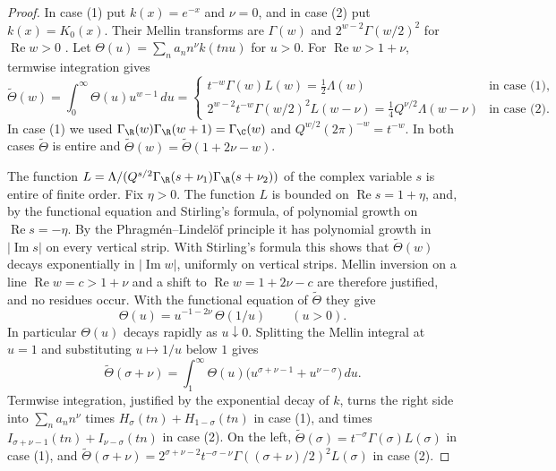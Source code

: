 \begin{proof}
In case (1) put $k(x)=e^{-x}$ and $\nu=0$, and in case (2) put
$k(x)=K_0(x)$. Their Mellin transforms are $\Gamma(w)$ and
$2^{w-2}\Gamma(w/2)^2$ for $\operatorname{Re}w>0$
\cite[10.43.19]{DLMF}. Let $\Theta(u)=\sum_na_nn^\nu k(tnu)$ for $u>0$. For
$\operatorname{Re}w>1+\nu$, termwise integration gives
\[
 \widetilde\Theta(w)=\int_0^\infty\Theta(u)u^{w-1}\,du=
 \begin{cases}
 t^{-w}\Gamma(w)L(w)=\tfrac12\Lambda(w)&\text{in case (1)},\\
 2^{w-2}t^{-w}\Gamma(w/2)^2L(w-\nu)=\tfrac14Q^{\nu/2}\Lambda(w-\nu)
 &\text{in case (2)}.
 \end{cases}
\]
In case (1) we used $\Gamma_\R(w)\Gamma_\R(w+1)=\Gamma_\C(w)$ and
$Q^{w/2}(2\pi)^{-w}=t^{-w}$. In both cases $\widetilde\Theta$ is entire and
$\widetilde\Theta(w)=\widetilde\Theta(1+2\nu-w)$.

The function $L=\Lambda/(Q^{s/2}\Gamma_\R(s+\nu_1)\Gamma_\R(s+\nu_2))$ of the
complex variable $s$ is entire of finite order. Fix $\eta>0$. The function
$L$ is bounded on $\operatorname{Re}s=1+\eta$, and, by the functional
equation and Stirling's formula, of polynomial growth on
$\operatorname{Re}s=-\eta$. By the Phragm\'en--Lindel\"of principle it has
polynomial growth in $|\operatorname{Im}s|$ on every vertical strip. With
Stirling's formula this shows that $\widetilde\Theta(w)$ decays exponentially in
$|\operatorname{Im}w|$, uniformly on vertical strips. Mellin inversion on a
line $\operatorname{Re}w=c>1+\nu$ and a shift to
$\operatorname{Re}w=1+2\nu-c$ are therefore justified, and no residues
occur. With the functional equation of $\widetilde\Theta$ they give
\[
 \Theta(u)=u^{-1-2\nu}\,\Theta(1/u)\qquad(u>0).
\]
In particular $\Theta(u)$ decays rapidly as $u\downarrow0$. Splitting the
Mellin integral at $u=1$ and substituting $u\mapsto1/u$ below $1$ gives
\[
 \widetilde\Theta(\sigma+\nu)=\int_1^\infty\Theta(u)
 \bigl(u^{\sigma+\nu-1}+u^{\nu-\sigma}\bigr)\,du.
\]
Termwise integration, justified by the exponential decay of $k$, turns the
right side into $\sum_na_nn^\nu$ times $H_\sigma(tn)+H_{1-\sigma}(tn)$ in case
(1), and times $I_{\sigma+\nu-1}(tn)+I_{\nu-\sigma}(tn)$ in case (2). On the
left, $\widetilde\Theta(\sigma)=t^{-\sigma}\Gamma(\sigma)L(\sigma)$ in case (1), and
$\widetilde\Theta(\sigma+\nu)=2^{\sigma+\nu-2}t^{-\sigma-\nu}
\Gamma((\sigma+\nu)/2)^2L(\sigma)$ in case (2).
\end{proof}

